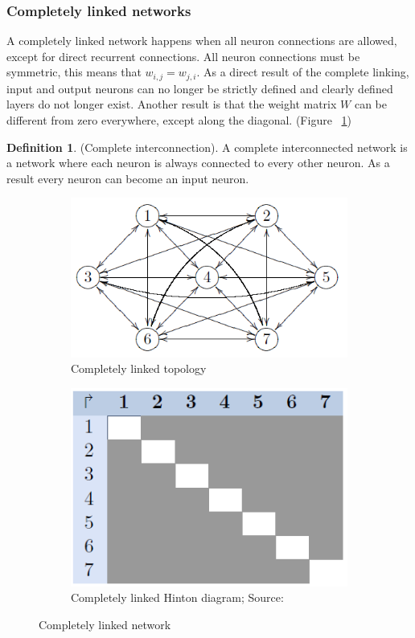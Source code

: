 \documentclass[pdftex,a4paper,12pt,twoside]{report}
\theoremstyle{plain} \newtheorem{theorem}{Theorem} \newtheorem{proposition}{Proposition} \newtheorem{lemma}{Lemma} \newtheorem*{corollary}{Corollary}
\theoremstyle{definition} \newtheorem{definition}{Definition} \newtheorem{conjecture}{Conjecture} \newtheorem*{example}{Example} \newtheorem{algorithm}{Algorithm}
\theoremstyle{remark} \newtheorem*{remark}{Remark} \newtheorem*{note}{Note} \newtheorem{case}{Case}
\begin{document}
\subsubsection{Completely linked networks}
A completely linked network happens when all neuron connections are allowed, except for direct recurrent connections. All neuron connections must be symmetric, this means that $w_{i,j} = w_{j,i}$. As a direct result of the complete linking, input and output neurons can no longer be strictly defined and clearly defined layers do not longer exist. Another result is that the weight matrix $W$ can be different from zero everywhere, except along the diagonal. (Figure ~\ref{fig:completelylinked})
\begin{definition}
(Complete interconnection). A complete interconnected network is a network where each neuron is always connected to every other neuron. As a result every neuron can become an input neuron.
\end{definition}
\begin{figure}
\centering
	\begin{subfigure}[b]{0.49\textwidth}
	\centering
	\includegraphics[width=\textwidth]{./img/Completelylinked-Topology.png}
	\caption{Completely linked topology}
	\end{subfigure}
	\begin{subfigure}[b]{0.49\textwidth}
	\centering
	\includegraphics[width=\textwidth]{./img/Completelylinked-Hinton.png}
	\caption{Completely linked Hinton diagram; Source:\citep{Kriesel2013}}
	\end{subfigure}
\caption{Completely linked network}
\label{fig:completelylinked}
\end{figure}
\end{document}
